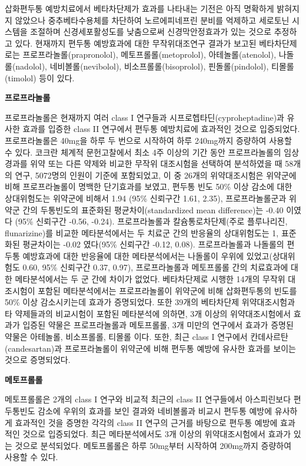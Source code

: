 \documentclass[]{book}
\begin{document}
삽화편두통 예방치료에서 베타차단제가 효과를 나타내는 기전은 아직 명확하게 밝혀지지 않았으나 중추베타수용체를 차단하여 노르에피네프린 분비를 억제하고 세로토닌 시스템을 조절하며 신경세포활성도를 낮춤으로써 신경막안정효과가 있는 것으로 추정하고 있다. 현재까지 편두통 예방효과에 대한 무작위대조연구 결과가 보고된 베타차단제로는 프로프라놀롤(prapronolol), 메토프롤롤(metoprolol), 아테놀롤(atenolol), 나돌롤(nadolol), 네비볼롤(nevibolol), 비소프롤롤(bisoprolol), 핀돌롤(pindolol), 티몰롤(timolol) 등이 있다.

\textbf{프로프라놀롤}

프로프라놀롤은 현재까지 여러 class I 연구들과 시프로헵타딘(cyproheptadine)과 유사한 효과를 입증한 class II 연구에서 편두통 예방치료에 효과적인 것으로 입증되었다. 프로프라놀롤은 40mg을 하루 두 번으로 시작하여 하루 240mg까지 증량하여 사용할 수 있다. 코크란 체계적 문헌고찰에서 최소 4주 이상의 기간 동안 프로프라놀롤의 임상경과를 위약 또는 다른 약제와 비교한 무작위 대조시험을 선택하여 분석하였을 때 58개의 연구, 5072명의 인원이 기준에 포함되었고, 이 중 26개의 위약대조시험은 위약군에 비해 프로프라놀롤이 명백한 단기효과를 보였고, 편두통 빈도 50\% 이상 감소에 대한 상대위험도는 위약군에 비해서 1.94 (95\% 신뢰구간 1.61, 2.35), 프로프라놀롤군과 위약군 간의 두통빈도의 표준화된 평균차이(standardized mean difference)는 -0.40 이였다 (95\% 신뢰구간 -0.56, -0.24). 프로프라놀롤과 칼슘통로차단제(주로 플루나리진, flunarizine)를 비교한 메타분석에서는 두 치료군 간의 반응율의 상대위험도는 1, 표준화된 평균차이는 -0.02 였다(95\% 신뢰구간 -0.12, 0.08). 프로프라놀롤과 나돌롤의 편두통 예방효과에 대한 반응율에 대한 메타분석에서는 나돌롤이 우위에 있었고(상대위험도 0.60, 95\% 신뢰구간 0.37, 0.97), 프로프라놀롤과 메토프롤롤 간의 치료효과에 대한 메타분석에서는 두 군 간에 차이가 없었다. 베타차단제로 시행한 14개의 무작위 대조시험이 포함된 메타분석에서는 프로프라놀롤이 위약군에 비해 삽화편두통의 빈도를 50\% 이상 감소시키는데 효과가 증명되었다. 또한 39개의 베타차단제 위약대조시험과 타 약제들과의 비교시험이 포함된 메타분석에 의하면, 3개 이상의 위약대조시험에서 효과가 입증된 약물은 프로프라놀롤과 메토프롤롤, 3개 미만의 연구에서 효과가 증명된 약물은 아테놀롤, 비소프롤롤, 티몰롤 이다. 또한, 최근 class I 연구에서 칸데사르탄(candesartan)과 프로프라놀롤이 위약군에 비해 편두통 예방에 유사한 효과를 보이는 것으로 증명되었다.

\textbf{메토프롤롤}

메토프롤롤은 2개의 class I 연구와 비교적 최근의 class II 연구들에서 아스피린보다 편두통빈도 감소에 우위의 효과를 보인 결과와 네비볼롤과 비교시 편두통 예방에 유사하게 효과적인 것을 증명한 각각의 class II 연구의 근거를 바탕으로 편두통 예방에 효과적인 것으로 입증되었다. 최근 메타분석에서도 3개 이상의 위약대조시험에서 효과가 있는 것으로 분석되었다. 메토프롤롤은 하루 50mg부터 시작하여 200mg까지 증량하여 사용할 수 있다.
\end{document}
